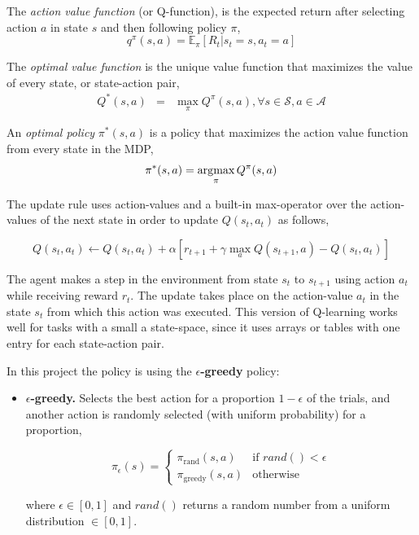 The \emph{action value function} (or Q-function), is the expected return after selecting action $a$ in state $s$ and then following policy $\pi$,
%
\begin{equation}
q^\pi(s,a) = \mathbb{E}_\pi \left[ R_t | s_t = s, a_t = a \right]
\end{equation}

The \emph{optimal value function} is the unique value function that maximizes the value of every state, or state-action pair,
%
\begin{eqnarray}
Q^*(s,a) & = & \max\limits_\pi Q^\pi(s,a), \forall s \in \mathcal{S}, a \in \mathcal{A}
\end{eqnarray}

An \emph{optimal policy} $\pi^*(s,a)$ is a policy that maximizes the action value function from every state in the MDP,
%
\begin{equation}
    \pi^*(s,a) = \operatorname*{\arg\!\max}_\pi Q^\pi(s, a)
\end{equation}

The update rule uses action-values and a built-in max-operator over the action-values of the next state in order to update $Q(s_t, a_t)$ as follows,

\begin{equation}
Q(s_t,a_t) \gets Q(s_t,a_t) + \alpha \left[r_{t+1} + \gamma \max_a Q(s_{t+1},a) - Q(s_t,a_t)\right]
\end{equation}

The agent makes a step in the environment from state $s_t$ to $s_{t+1}$ using action $a_t$ while receiving reward $r_t$. The update takes place on the action-value $a_t$ in the state $s_t$ from which this action was executed. This version of Q-learning works well for tasks with a small a state-space, since it uses arrays or tables with one entry for each state-action pair.

In this project the policy is using the \textbf{$\epsilon$-greedy} policy:

\begin{itemize}

    \item \textbf{$\epsilon$-greedy.} Selects the best action for a proportion
        $1 - \epsilon$ of the trials, and another action is randomly selected (with
        uniform probability) for a proportion,
        
        \begin{equation}
            \pi_{\epsilon}(s) = \left\{
             \begin{array}{lr}
                 \pi_{\textrm{rand}}(s,a) & \text{if } rand() < \epsilon\\
                 \pi_{\textrm{greedy}}(s,a) & \text{otherwise}
             \end{array}
           \right.
        \end{equation}

        where $\epsilon \in [0, 1]$ and $rand()$ returns a random number from a uniform distribution $\in [0, 1]$.

\end{itemize}

